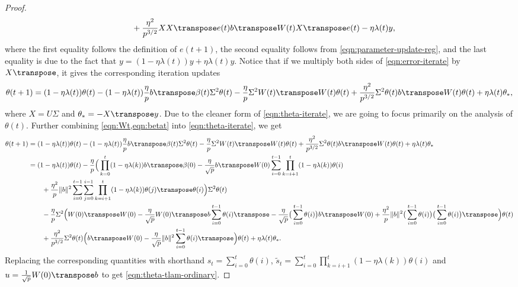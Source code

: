 \begin{proof}
\begin{align}
\begin{split}
            & \qquad + \frac{\eta^2}{p^{3/2}}XX\transpose e(t) b\transpose W(t) X\transpose e(t) - \eta\lambda(t) y, 
        \end{split}
    \end{align}
    where the first equality follows the definition of $e(t+1)$, the second equality follows from \cref{eqn:parameter-update-reg}, and the last equality is due to the fact that $y = (1-\eta\lambda(t))y + \eta\lambda(t) y$. Notice that if we multiply both sides of \cref{eqn:error-iterate} by $X\transpose$, it gives the corresponding iteration updates
    \begin{align}\label{eqn:theta-iterate}
        \theta(t+1) = (1-\eta\lambda(t))\theta(t) - (1-\eta\lambda(t)) \frac{\eta}{p} b\transpose\beta(t) \Sigma^2\theta(t) - \frac{\eta}{p} \Sigma^2 W(t)\transpose W(t)\theta(t) + \frac{\eta^2}{p^{3/2}}\Sigma^2\theta(t) b\transpose W(t) \theta(t) + \eta\lambda(t) \theta_\ast, 
    \end{align}
    where $X = U\Sigma$ and $\theta_\ast = -X\transpose y$. Due to the cleaner form of \cref{eqn:theta-iterate}, we are going to focus primarily on the analysis of $\theta(t)$. Further combining \cref{eqn:Wt,eqn:betat} into \cref{eqn:theta-iterate}, we get
    \begin{align*}
        \theta(t+1) & = (1-\eta\lambda(t))\theta(t) - (1-\eta\lambda(t))\frac{\eta}{p}b\transpose\beta(t) \Sigma^2\theta(t) - \frac{\eta}{p}\Sigma^2 W(t)\transpose W(t)\theta(t) + \frac{\eta^2}{p^{3/2}}\Sigma^2\theta(t) b\transpose W(t) \theta(t) + \eta\lambda(t) \theta_\ast \\
        & = (1-\eta\lambda(t))\theta(t) - \frac{\eta}{p}\Big(\prod_{k=0}^t(1-\eta\lambda(k))b\transpose \beta(0) - \frac{\eta}{\sqrt p} b\transpose W(0)\sum_{i=0}^{t-1}\prod_{k=i+1}^t(1-\eta\lambda(k))\theta(i) \\
        & \qquad  + \frac{\eta^2}{p}\|b\|^2\sum_{i=0}^{t-1}\sum_{j=0}^{i-1}\prod_{k=i+1}^t(1-\eta\lambda(k))\theta(j)\transpose\theta(i) \Big)\Sigma^2\theta(t) \\
        & \qquad - \frac{\eta}{p}\Sigma^2\Big( W(0)\transpose W(0) - \frac{\eta}{\sqrt p}W(0)\transpose b\sum_{i=0}^{t-1}\theta(i)\transpose -\frac{\eta}{\sqrt p}\big(\sum_{i=0}^{t-1}\theta(i)\big)b\transpose W(0) + \frac{\eta^2}{p}\|b\|^2 \big(\sum_{i=0}^{t-1}\theta(i)\big)\big(\sum_{i=0}^{t-1}\theta(i)\big)\transpose\Big)\theta(t) \\
        & \qquad + \frac{\eta^2}{p^{3/2}}\Sigma^2\theta(t)\Big(b\transpose W(0) - \frac{\eta}{\sqrt p}\|b\|^2 \sum_{i=0}^{t-1}\theta(i)\transpose\Big)\theta(t) + \eta\lambda(t) \theta_\ast.
    \end{align*}
    Replacing the corresponding quantities with shorthand $s_{t} = \sum_{i=0}^{t} \theta(i)$, $\tilde s_{t} = \sum_{i=0}^{t} \prod_{k=i+1}^t (1-\eta\lambda(k))\theta(i)$ and $u = \frac{1}{\sqrt{p}} W(0)\transpose b$ to get \cref{eqn:theta-tlam-ordinary}.
\end{proof}

